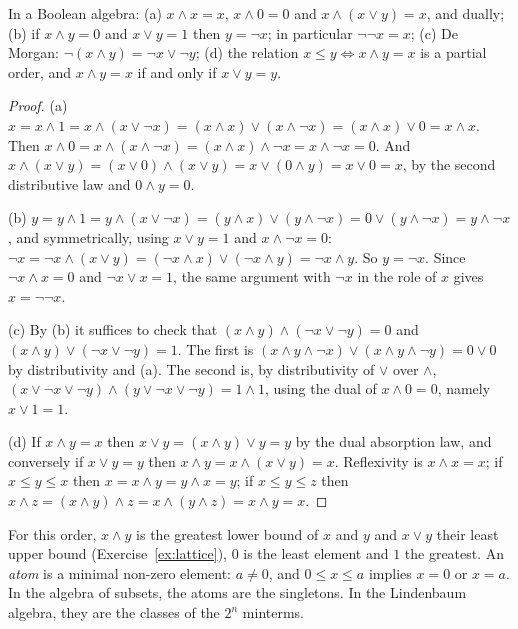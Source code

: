 \begin{lemma}\label{lem:boolbasic}
In a Boolean algebra: (a) $x\land x=x$, $x\land0=0$ and $x\land(x\lor y)=x$, and dually; (b) if $x\land y=0$ and $x\lor y=1$ then $y=\neg x$;
in particular $\neg\neg x=x$; (c) De Morgan: $\neg(x\land y)=\neg x\lor\neg y$; (d) the relation $x\le y\iff x\land y=x$ is a partial order, and
$x\land y=x$ if and only if $x\lor y=y$.
\end{lemma}
\begin{proof}
(a) $x=x\land1=x\land(x\lor\neg x)=(x\land x)\lor(x\land\neg x)=(x\land x)\lor0=x\land x$. Then
$x\land0=x\land(x\land\neg x)=(x\land x)\land\neg x=x\land\neg x=0$. And $x\land(x\lor y)=(x\lor0)\land(x\lor y)=x\lor(0\land y)=x\lor0=x$, by the second distributive law
and $0\land y=0$.

(b) $y=y\land1=y\land(x\lor\neg x)=(y\land x)\lor(y\land\neg x)=0\lor(y\land\neg x)=y\land\neg x$, and symmetrically, using $x\lor y=1$ and
$x\land\neg x=0$: $\neg x=\neg x\land(x\lor y)=(\neg x\land x)\lor(\neg x\land y)=\neg x\land y$. So $y=\neg x$. Since $\neg x\land x=0$ and $\neg x\lor x=1$, the same
argument with $\neg x$ in the role of $x$ gives $x=\neg\neg x$.

(c) By (b) it suffices to check that $(x\land y)\land(\neg x\lor\neg y)=0$ and $(x\land y)\lor(\neg x\lor\neg y)=1$. The first is
$(x\land y\land\neg x)\lor(x\land y\land\neg y)=0\lor0$ by distributivity and (a). The second is, by distributivity of $\lor$ over $\land$,
$(x\lor\neg x\lor\neg y)\land(y\lor\neg x\lor\neg y)=1\land1$, using the dual of $x\land0=0$, namely $x\lor1=1$.

(d) If $x\land y=x$ then $x\lor y=(x\land y)\lor y=y$ by the dual absorption law, and conversely if $x\lor y=y$ then
$x\land y=x\land(x\lor y)=x$. Reflexivity is $x\land x=x$; if $x\le y\le x$ then $x=x\land y=y\land x=y$; if $x\le y\le z$ then
$x\land z=(x\land y)\land z=x\land(y\land z)=x\land y=x$.
\end{proof}

For this order, $x\land y$ is the greatest lower bound of $x$ and $y$ and $x\lor y$ their least upper bound (Exercise~\ref{ex:lattice}), $0$ is
the least element and $1$ the greatest. An \emph{atom} is a minimal non-zero element: $a\ne0$, and $0\le x\le a$ implies $x=0$
or $x=a$. In the algebra of subsets, the atoms are the singletons. In the Lindenbaum algebra, they are the classes of
the $2^n$ minterms.

